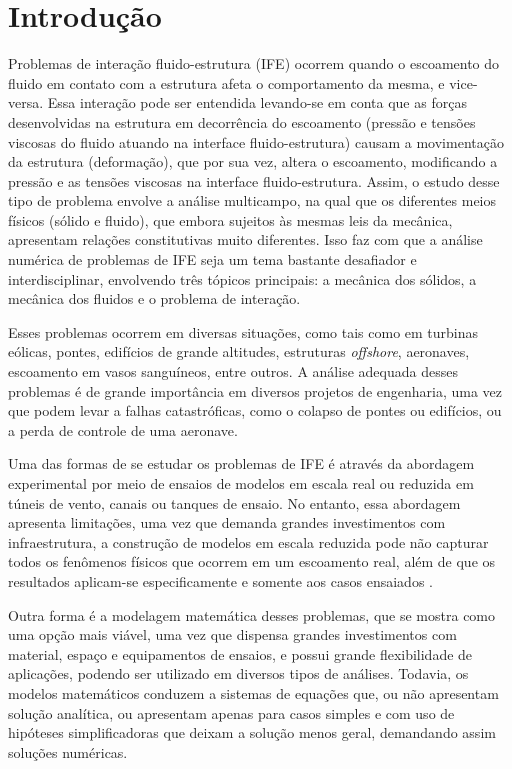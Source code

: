 \chapter{Introdução}\label{CapIntroducao}

Problemas de interação fluido-estrutura (IFE) ocorrem quando o escoamento do fluido em contato com a estrutura afeta o comportamento da mesma, e vice-versa. Essa interação pode ser entendida levando-se em conta que as forças desenvolvidas na estrutura em decorrência do escoamento (pressão e tensões viscosas do fluido atuando na interface fluido-estrutura)  causam a movimentação da estrutura (deformação), que por sua vez, altera o escoamento, modificando a pressão e as tensões viscosas na interface fluido-estrutura. Assim, o estudo desse tipo de problema envolve a análise multicampo, na qual que os diferentes meios físicos (sólido e fluido), que embora sujeitos às mesmas leis da mecânica, apresentam relações constitutivas muito diferentes. Isso faz com que a análise numérica de problemas de IFE seja um tema bastante desafiador e interdisciplinar, envolvendo três tópicos principais: a mecânica dos sólidos, a mecânica dos fluidos e o problema de interação.

Esses problemas ocorrem em diversas situações, como tais como em turbinas eólicas, pontes, edifícios de grande altitudes, estruturas \textit{offshore}, aeronaves, escoamento em vasos sanguíneos, entre outros. A análise adequada desses problemas é de grande importância em diversos projetos de engenharia, uma vez que podem levar a falhas catastróficas, como o colapso de pontes ou edifícios, ou a perda de controle de uma aeronave.

Uma das formas de se estudar os problemas de IFE é através da abordagem experimental por meio de ensaios de modelos em escala real ou reduzida em túneis de vento, canais ou tanques de ensaio. No entanto, essa abordagem apresenta limitações, uma vez que demanda grandes investimentos com infraestrutura, a construção de modelos em escala reduzida pode não capturar todos os fenômenos físicos que ocorrem em um escoamento real, além de que os resultados aplicam-se especificamente e somente aos casos ensaiados \cite{fernandes2020tecnica}.

Outra forma é a modelagem matemática desses problemas, que se mostra como uma opção mais viável, uma vez que dispensa grandes investimentos com material, espaço e equipamentos de ensaios, e possui grande flexibilidade de aplicações, podendo ser utilizado em diversos tipos de análises. Todavia, os modelos matemáticos conduzem a sistemas de equações que, ou não apresentam solução analítica, ou apresentam apenas para casos simples e com uso de hipóteses simplificadoras que deixam a solução menos geral, demandando assim soluções numéricas.

